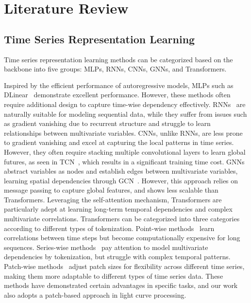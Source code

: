\section{Literature Review}
\subsection{Time Series Representation Learning}

Time series representation learning methods can be categorized based on the backbone into five groups: MLPs, RNNs, CNNs, GNNs, and Transformers. 

Inspired by the efficient performance of autoregressive models, 
MLPs 
such as DLinear~\cite{DBLP:conf/aaai/ZengCZ023} demonstrate excellent performance. However, these methods often require additional design to capture time-wise dependency effectively. 
RNNs~\cite{DBLP:conf/sigir/LaiCYL18,DBLP:conf/ijcai/QinSCCJC17} are naturally suitable for modeling sequential data, while they suffer from issues such as gradient vanishing due to recurrent structure and struggle to learn relationships between multivariate variables. 
CNNs, unlike RNNs, are less prone to gradient vanishing and excel at capturing the local patterns in time series. However, they often require stacking multiple convolutional layers to learn global futures, as seen in TCN~\cite{DBLP:journals/corr/abs-1803-01271}, which results in a significant training time cost. 
GNNs~\cite{DBLP:conf/kdd/WuPL0CZ20,DBLP:conf/iclr/LiYS018} abstract variables as nodes and establish edges between multivariate variables, learning spatial dependencies through GCN~\cite{DBLP:conf/iclr/KipfW17}. However, this approach relies on message passing to capture global features, and shows less scalable than Transformers. 
Leveraging the self-attention mechanism, Transformers are particularly adept at learning long-term temporal dependencies and complex multivariate correlations. 
Transformers can be categorized into three categories according to different types of tokenization. 
Point-wise methods~\cite{DBLP:conf/nips/WuXWL21,Woo_ETSformer_2022} learn correlations between time steps but become computationally expensive for long sequences.
Series-wise methods~\cite{DBLP:conf/iclr/LiuHZWWML24} pay attention to model multivariate dependencies by tokenization, but struggle with complex temporal patterns.
Patch-wise methods~\cite{DBLP:conf/iclr/NieNSK23,DBLP:conf/iclr/ZhangY23} adjust patch sizes for flexibility across different time series, making them more adaptable to different types of time series data.
These methods have demonstrated certain advantages in specific tasks, and our work also adopts a patch-based approach in light curve processing.

